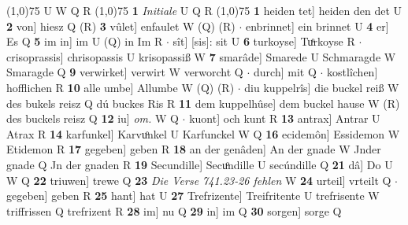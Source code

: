 \documentclass[8pt,a4paper,notitlepage]{article}
\begin{document}
\begin{table}[ht]
\begin{minipage}[t]{0.5\linewidth}
\scriptsize
\line(1,0){75} \newline
U W Q R \newline
\line(1,0){75} \newline
\textbf{1} \textit{Initiale} U Q R  \newline
\line(1,0){75} \newline
\textbf{1} heiden tet] heiden den det U \textbf{2} von] hiesz Q (R) \textbf{3} vûlet] enfaulet W (Q) (R)  $\cdot$ enbrinnet] ein brinnet U \textbf{4} er] Es Q \textbf{5} im in] im U (Q) in Im R  $\cdot$ sît] [sis]: sit U \textbf{6} turkoyse] Tuͦrkoyse R  $\cdot$ crisoprassis] chrisopassis U krisopassiß W \textbf{7} smarâde] Smarede U Schmaragde W Smaragde Q \textbf{9} verwirket] verwirt W verworcht Q  $\cdot$ durch] mit Q  $\cdot$ kostlîchen] hofflichen R \textbf{10} alle umbe] Allumbe W (Q) (R)  $\cdot$ diu kuppelrîs] die buckel reiß W des bukels reisz Q dú buckes Ris R \textbf{11} dem kuppelhûse] dem buckel hause W (R) des buckels reisz Q \textbf{12} iu] \textit{om.} W Q  $\cdot$ kuont] och kunt R \textbf{13} antrax] Antrar U Atrax R \textbf{14} karfunkel] Karvuͦnkel U Karfunckel W Q \textbf{16} ecidemôn] Essidemon W Etidemon R \textbf{17} gegeben] geben R \textbf{18} an der genâden] An der gnade W Jnder gnade Q Jn der gnaden R \textbf{19} Secundille] Secuͦndille U secúndille Q \textbf{21} dâ] Do U W Q \textbf{22} triuwen] trewe Q \textbf{23} \textit{Die Verse 741.23-26 fehlen} W  \textbf{24} urteil] vrteilt Q  $\cdot$ gegeben] geben R \textbf{25} hant] hat U \textbf{27} Trefrizente] Treifritente U trefrisente W triffrissen Q trefrizent R \textbf{28} im] nu Q \textbf{29} in] im Q \textbf{30} sorgen] sorge Q \newline
\end{minipage}
\end{table}
\end{document}
